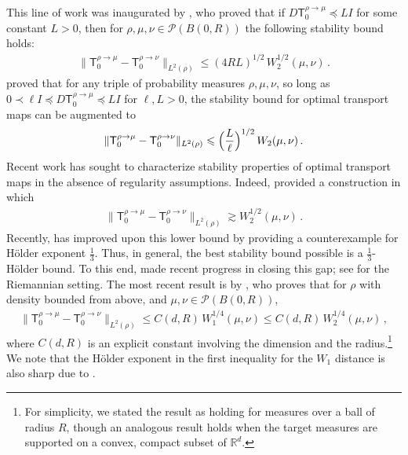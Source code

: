 \documentclass[12pt]{article}
\newcommand{\cP}{\mathcal{P}}
\newcommand{\RR}{\mathbb{R}}
\newcommand{\R}{\RR}
\newcommand{\1}{\mathds{1}}
\renewcommand{\leq}{\leqslant}
\theoremstyle{plain}
\theoremstyle{definition}
\theoremstyle{remark}
\begin{document}
This line of work was inaugurated by \citet{gigli2011holder}, who proved that if $D\mathsf  T_0^{\rho\to\mu} \preceq L I$ for some constant $L > 0$, then for $\rho,\mu,\nu \in \cP(B(0,R))$ the following stability bound holds:
\begin{align*}
    \|\mathsf  T_0^{\rho\to\mu} - \mathsf  T_0^{\rho\to\nu}\|_{L^2(\rho)}\leq (4RL)^{1/2}\, W_2^{1/2}(\mu,\nu)\,. 
\end{align*}
\cite{manole2024plugin} proved that for any triple of probability measures $\rho,\mu,\nu$, so long as  $0 \prec \ell I \preceq D \mathsf T_0^{\rho\to\mu} \preceq L I$ for $\ell,L> 0$, the stability bound for optimal transport maps can be augmented to
\begin{align}\label{eq:ot_lip_stab}
    \|\mathsf  T_0^{\rho\to\mu} - \mathsf  T_0^{\rho\to\nu}\|_{L^2(\rho)}\leq \Bigl(\frac{L}{\ell}\Bigr)^{1/2}\, W_2(\mu,\nu)\,.
\end{align}
Recent work has sought to characterize stability properties of optimal transport maps in the absence of regularity assumptions. Indeed, \cite{gigli2011holder} provided a construction in which
\begin{align*}
    \|\mathsf T_0^{\rho\to\mu} - \mathsf  T_0^{\rho\to\nu}\|_{L^2(\rho)}\gtrsim W_2^{1/2}(\mu,\nu)\,.
\end{align*}
{Recently, \cite{letrouit_unstable_2026} has improved upon this lower bound by providing a counterexample for Hölder exponent $\frac{1}{3}$.}
Thus, in general, the best stability bound possible is a $\frac{1}{3}$-H\"older bound.
To this end, \cite{MerDelCha20Stability,delalande2023quantitative,letrouit2024gluing,cazelles2026statistical,merigot2026sharp} made recent progress in closing this gap; see \citet{kitagawa2025stability} for the Riemannian setting. The most recent result is by 
\cite{merigot2026sharp}, who proves that for $\rho$ with density bounded from above, and $\mu,\nu \in \cP(B(0,R))$, 
\begin{align}\label{eq:one_over_four}
    \|\mathsf T_0^{\rho\to\mu} - \mathsf T_0^{\rho\to\nu}\|_{L^2(\rho)}\leq C(d,R)\, W_1^{1/4}(\mu,\nu) \leq C(d,R)\,W_2^{1/4}(\mu,\nu)\,,
\end{align}
where $C(d,R)$ is an explicit constant involving the dimension and the radius.\footnote{For simplicity, we stated the result as holding for measures over a ball of radius $R$, though an analogous result holds when the target measures are supported on a convex, compact subset of $\R^d$.} {We note that the Hölder exponent in the first inequality for the $W_1$ distance is also sharp due to \cite{letrouit_unstable_2026}.}
\end{document}
